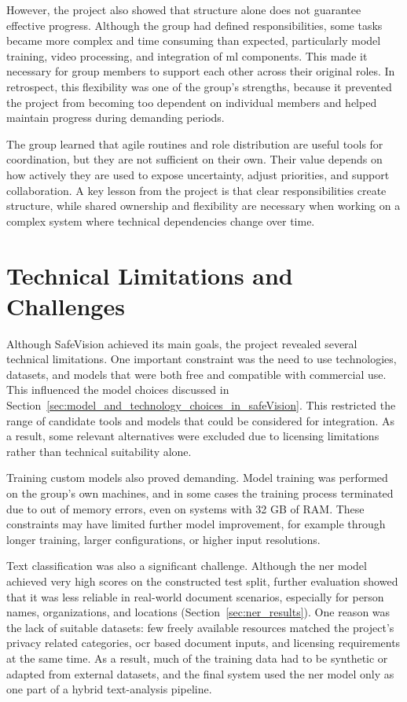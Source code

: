 However, the project also showed that structure alone does not guarantee effective progress. Although the group had defined responsibilities, some tasks became more complex and time consuming than expected, particularly model training, video processing, and integration of \acrshort{ml} components. This made it necessary for group members to support each other across their original roles. In retrospect, this flexibility was one of the group’s strengths, because it prevented the project from becoming too dependent on individual members and helped maintain progress during demanding periods.

The group learned that agile routines and role distribution are useful tools for coordination, but they are not sufficient on their own. Their value depends on how actively they are used to expose uncertainty, adjust priorities, and support collaboration. A key lesson from the project is that clear responsibilities create structure, while shared ownership and flexibility are necessary when working on a complex system where technical dependencies change over time.



\section{Technical Limitations and Challenges}
\label{sec:technical_limitations_and_challenges}

Although \gls{SafeVision} achieved its main goals, the project revealed several technical limitations. One important constraint was the need to use technologies, datasets, and models that were both free and compatible with commercial use. This influenced the model choices discussed in Section~\ref{sec:model_and_technology_choices_in_safeVision}. This restricted the range of candidate tools and models that could be considered for integration. As a result, some relevant alternatives were excluded due to licensing limitations rather than technical suitability alone.

Training custom models also proved demanding. Model training was performed on the group’s own machines, and in some cases the training process terminated due to out of memory errors, even on systems with 32 GB of RAM. These constraints may have limited further model improvement, for example through longer
training, larger configurations, or higher input resolutions.

Text classification was also a significant challenge. Although the \acrshort{ner} model achieved very high scores on the constructed test split, further evaluation showed that it was less reliable in real-world document scenarios, especially for person names, organizations, and locations (Section~\ref{sec:ner_results}). One reason was the lack of suitable datasets: few freely available resources matched the project’s privacy related categories, \acrshort{ocr} based document inputs, and licensing requirements at the same time. As a result, much of the training data had to be synthetic or adapted from external datasets, and the final system used the \acrshort{ner} model only as one part of a hybrid text-analysis pipeline.

